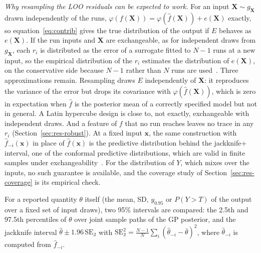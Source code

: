 \emph{Why resampling the LOO residuals can be expected to work.} For an
input $\mathbf X\sim g_{\mathbf X}$ drawn independently of the runs,
$\varphi(f(\mathbf X))=\varphi(\hat f(\mathbf X))+e(\mathbf X)$ exactly, so
equation~\eqref{eq:contrib} gives the true distribution of the output if $E$
behaves as $e(\mathbf X)$. If the run inputs and $\mathbf X$ are
exchangeable, as for independent draws from $g_{\mathbf X}$, each $r_i$ is
distributed as the error of a surrogate fitted to $N-1$ runs at a new input,
so the empirical distribution of the $r_i$ estimates the distribution of
$e(\mathbf X)$, on the conservative side because $N-1$ rather than $N$ runs
are used~\cite{arlot2010}. Three approximations remain. Resampling draws $E$
independently of $\mathbf X$: it reproduces the variance of the error but
drops its covariance with $\varphi(\hat f(\mathbf X))$, which is zero in
expectation when $\hat f$ is the posterior mean of a correctly specified
model but not in general. A Latin hypercube design is close to, not exactly,
exchangeable with independent draws. And a feature of $f$ that no run
reaches leaves no trace in any $r_i$ (Section~\ref{sec:res-robust}). At a
fixed input $\mathbf x$, the same construction with $\hat f_{-i}(\mathbf x)$
in place of $\hat f(\mathbf x)$ is the predictive distribution behind the
jackknife+ interval, one of the conformal predictive distributions, which
are valid in finite samples under exchangeability~\cite{barber2021,vovk2019}.
For the distribution of $Y$, which mixes over the inputs, no such guarantee
is available, and the coverage study of Section~\ref{sec:res-coverage} is
its empirical check.

For a reported quantity $\theta$ itself (the mean, SD, $y_{0.95}$ or
$P(Y>T)$ of the output over a fixed set of input draws), two 95\% intervals
are compared: the 2.5th and 97.5th percentiles of $\theta$ over joint sample
paths of the GP posterior, and the jackknife interval
$\hat\theta\pm1.96\,\mathrm{SE}_{\mathrm J}$ with
$\mathrm{SE}_{\mathrm J}^2=\frac{N-1}{N}\sum_i(\hat\theta_{-i}-\bar\theta)^2$,
where $\hat\theta_{-i}$ is computed from $\hat f_{-i}$.

